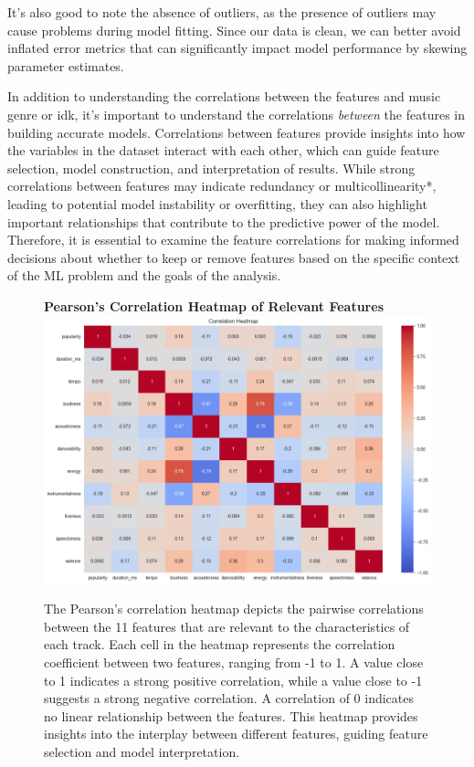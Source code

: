 \documentclass[times, twocolumn]{article}
\begin{document}
It's also good to note the absence of outliers, as the presence of outliers may cause problems during model fitting. Since our data is clean, we can better avoid inflated error metrics that can significantly impact model performance by skewing parameter estimates.

In addition to understanding the correlations between the features and music genre or idk, it's important to understand the correlations \textit{between} the features in building accurate models. Correlations between features provide insights into how the variables in the dataset interact with each other, which can guide feature selection, model construction, and interpretation of results. While strong correlations between features may indicate redundancy or multicollinearity*, leading to potential model instability or overfitting, they can also highlight important relationships that contribute to the predictive power of the model. Therefore, it is essential to examine the feature correlations for making informed decisions about whether to keep or remove features based on the specific context of the ML problem and the goals of the analysis.\\

\begin{figure}[H]
    \centering
    \textbf{Pearson's Correlation Heatmap of Relevant Features}
    \includegraphics[width=1.0\linewidth]{corr_heatmap.png}
    \caption{The Pearson's correlation heatmap depicts the pairwise correlations between the 11 features that are relevant to the characteristics of each track. Each cell in the heatmap represents the correlation coefficient between two features, ranging from -1 to 1. A value close to 1 indicates a strong positive correlation, while a value close to -1 suggests a strong negative correlation. A correlation of 0 indicates no linear relationship between the features. This heatmap provides insights into the interplay between different features, guiding feature selection and model interpretation.}
    \label{heatmap}
\end{figure}
\end{document}
